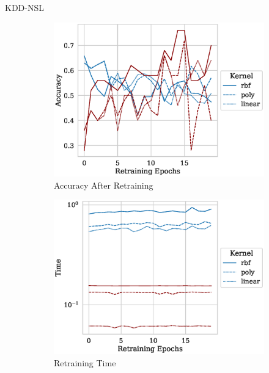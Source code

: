 \documentclass{beamer}
\begin{document}
\begin{frame}{KDD-NSL}
    \begin{figure}
     \centering
     \begin{subfigure}{0.4\textwidth}
         \centering
         \includegraphics[width=\textwidth]{./kdd-nsl/retrain_accuracy.eps}
         \caption{Accuracy After Retraining}
     \end{subfigure}
     \hfill
     \begin{subfigure}{0.4\textwidth}
         \centering
         \includegraphics[width=\textwidth]{./kdd-nsl/retrain_time.eps}
         \caption{Retraining Time}
     \end{subfigure}
     \hfill
     \begin{subfigure}{0.4\textwidth}

\end{subfigure}
\end{figure}
\end{frame}
\end{document}
